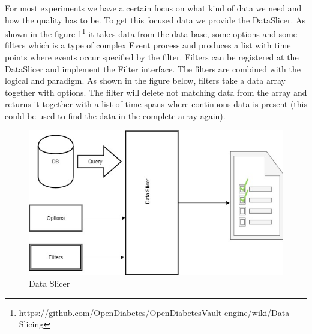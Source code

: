 \documentclass[article,type=msc,colorback,accentcolor=tud9c,twoside,11pt]{tudthesis}
\begin{document}
For most experiments we have a certain focus on what kind of data we need and how the quality has to be. To get this focused data we provide the DataSlicer. As shown in the figure \ref{fig:Dataslicer}\footnote{https://github.com/OpenDiabetes/OpenDiabetesVault-engine/wiki/Data-Slicing} it takes data from the data base, some options and some filters which is a type of complex Event process \cite{EventProcessing} and produces a list with time points where events occur specified by the filter. Filters can be registered at the DataSlicer and implement the Filter interface. The filters are combined with the logical and paradigm. As shown in the figure below, filters take a data array together with options. The filter will delete not matching data from the array and returns it together with a list of time spans where continuous data is present (this could be used to find the data in the complete array again). 
\begin{figure}[h]
	\centering
	\includegraphics[scale=0.7]{Dataslicer.jpg}
	\caption{Data Slicer}
	\label{fig:Dataslicer}
\end{figure}
\end{document}
